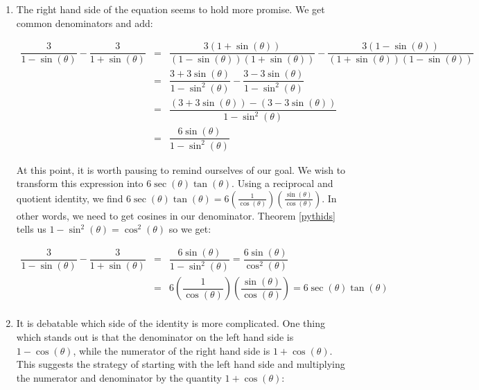 {\begin{enumerate}
\drawexampleline

\item  The right hand side of the equation seems to hold more promise.  We get common denominators and add:

\[ \begin{array}{rcl}

\dfrac{3}{1-\sin(\theta)} - \dfrac{3}{1 + \sin(\theta)} & = & \dfrac{3(1 + \sin(\theta))}{(1-\sin(\theta))(1 + \sin(\theta))} - \dfrac{3(1-\sin(\theta))}{(1 + \sin(\theta))(1-\sin(\theta))} \\ [.25in]
                                                        & = & \dfrac{3 + 3\sin(\theta)}{1 - \sin^{2}(\theta)} - \dfrac{3 - 3\sin(\theta)}{1 - \sin^{2}(\theta)} \\ [.25in]
                                                        & = & \dfrac{(3 + 3\sin(\theta)) - (3 - 3\sin(\theta))}{1 - \sin^{2}(\theta)} \\ [.25in]                                                        																																	& = & \dfrac{6 \sin(\theta)}{1 - \sin^{2}(\theta)} \end{array} \]

At this point, it is worth pausing to remind ourselves of our goal.  We wish to transform this expression into $6\sec(\theta) \tan(\theta)$.  Using a reciprocal and quotient identity, we find $6\sec(\theta) \tan(\theta) = 6 \left(\frac{1}{\cos(\theta)}\right) \left(\frac{\sin(\theta)}{\cos(\theta)}\right)$.  In other words, we need to get cosines in our denominator. Theorem \ref{pythids} tells us $1 -  \sin^{2}(\theta) = \cos^{2}(\theta)$ so we get:

\[ \begin{array}{rcl}

\dfrac{3}{1-\sin(\theta)} - \dfrac{3}{1 + \sin(\theta)} & = & \dfrac{6 \sin(\theta)}{1 - \sin^{2}(\theta)}= \dfrac{6 \sin(\theta)}{\cos^{2}(\theta)} \\ [.25in]
& = &  6 \left(\dfrac{1}{\cos(\theta)}\right)\left( \dfrac{\sin(\theta)}{\cos(\theta)}\right) = 6 \sec(\theta) \tan(\theta) \\ \end{array} \]

\item  It is debatable which side of the identity is more complicated.  One thing which stands out is that the denominator on the left hand side is $1-\cos(\theta)$, while the numerator of the right hand side is $1+\cos(\theta)$.  This suggests the strategy of starting with the left hand side and multiplying the numerator and denominator by the quantity $1+\cos(\theta)$:


\end{enumerate}}
